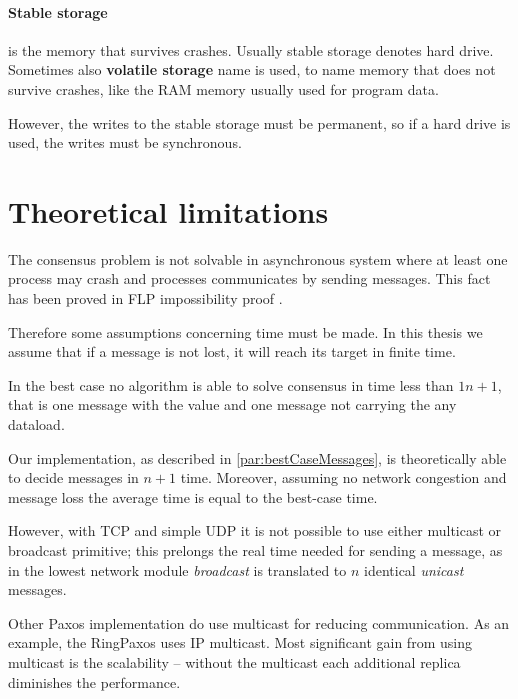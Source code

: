 \paragraph{Stable storage}
is the memory that survives crashes. Usually stable storage denotes hard drive.
Sometimes also \textbf{volatile storage} name is used, to name memory that does not survive crashes, like the RAM memory usually used for program data.

\noindent However, the writes to the stable storage must be permanent, so if a hard drive is used, the writes must be synchronous.

\section{Theoretical limitations}


The consensus problem is not solvable in asynchronous system where at least one process may crash and processes communicates by sending messages. This fact has been proved in FLP impossibility proof \cite{FLP}.

Therefore some assumptions concerning time must be made. In this thesis we assume that if a message is not lost, it will reach its target in finite time.


In the best case no algorithm is able to solve consensus in time less than $1n+1$, that is one message with the value and one message not carrying the any dataload.

Our implementation, as described in \ref{par:bestCaseMessages}, is theoretically able to decide messages in $n+1$ time. Moreover, assuming no network congestion and message loss the average time is equal to the best-case time.

However, with TCP and simple UDP it is not possible to use either multicast or broadcast primitive; this prelongs the real time needed for sending a message, as in the lowest network module \emph{broadcast} is translated to $n$ identical \textit{unicast} messages.

Other Paxos implementation do use multicast for reducing communication. As an example, the RingPaxos \cite{Mar10} uses IP multicast. Most significant gain from using multicast is the scalability -- without the multicast each additional replica diminishes the performance.

